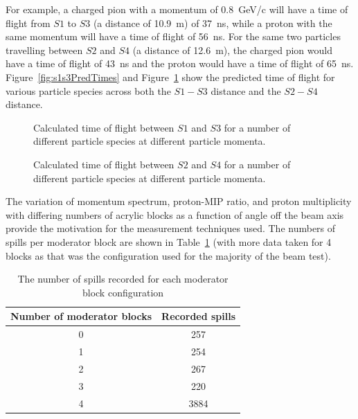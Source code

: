 For example, a charged pion with a momentum of 0.8~GeV/c will have a time of flight from $\mathit{S1}$ to $\mathit{S3}$ (a distance of 10.9~m) of 37~ns, while a proton with the same momentum will have a time of flight of 56~ns.
For the same two particles travelling between $\mathit{S2}$ and $\mathit{S4}$ (a distance of 12.6~m), the charged pion would have a time of flight of 43~ns and the proton would have a time of flight of 65~ns.
Figure~\ref{fig:s1s3PredTimes} and Figure~\ref{fig:s2s4PredTimes} show the predicted time of flight for various particle species across both the $\mathit{S1}-\mathit{S3}$ distance and the $\mathit{S2}-\mathit{S4}$ distance.

\begin{figure}[ht]
  \begin{minipage}[t]{0.49\textwidth}
    \begin{adjustbox}{max totalsize={\textwidth}{.5\textheight},center}
      
    \end{adjustbox}
    \caption{Calculated time of flight between $\mathit{S1}$ and $\mathit{S3}$ for a number of different particle species at different particle momenta.}
    \label{fig:s1s3PredTimes}
  \end{minipage}
  \hfill
  \begin{minipage}[t]{0.49\textwidth}
    \begin{adjustbox}{max totalsize={\textwidth}{.5\textheight},center}
      
    \end{adjustbox}
    \caption{Calculated time of flight between $\mathit{S2}$ and $\mathit{S4}$ for a number of different particle species at different particle momenta.}
    \label{fig:s2s4PredTimes}
  \end{minipage}
\end{figure}

The variation of momentum spectrum, proton-MIP ratio, and proton multiplicity with differing numbers of acrylic blocks as a function of angle off the beam axis provide the motivation for the measurement techniques used.
The numbers of spills per moderator block are shown in Table~\ref{tab:spills} (with more data taken for 4 blocks as that was the configuration used for the majority of the beam test).

\begin{table}
  \centering
  \begin{tabular}{|c|c|}
    \hline
    Number of moderator blocks & Recorded spills \\
    \hline
    0 & 257 \\
    1 & 254 \\
    2 & 267 \\
    3 & 220 \\
    4 & 3884 \\
    \hline
  \end{tabular}
  \caption{The number of spills recorded for each moderator block configuration}
  \label{tab:spills}
\end{table}

